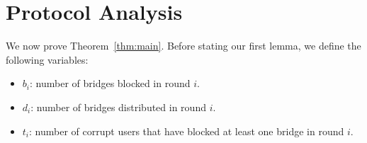 \documentclass[letterpaper,twocolumn,10pt]{article}
\begin{document}
\section{Protocol Analysis} \label{sec:ProofBasic}
We now prove Theorem~\ref{thm:main}. 
Before stating our first lemma, we define the following variables:
\begin{itemize}
	\item $b_i$: number of bridges blocked in round $i$.	
	\item $d_i$: number of bridges distributed in round $i$.
	\item $t_i$: number of corrupt users that have blocked at least one bridge in round $i$.
\end{itemize}
\end{document}
